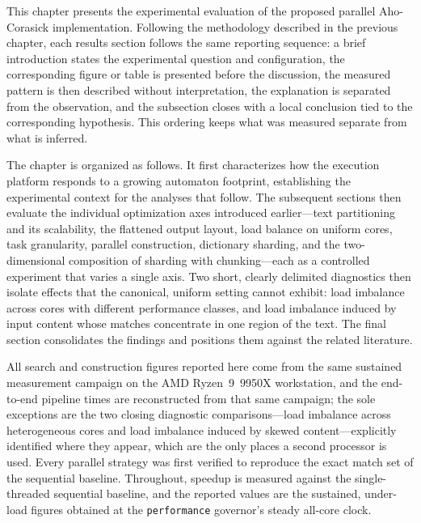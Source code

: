 This chapter presents the experimental evaluation of the proposed parallel
Aho-Corasick implementation. Following the methodology described in the previous
chapter, each results section follows the same reporting sequence: a brief
introduction states the experimental question and configuration, the corresponding
figure or table is presented before the discussion, the measured pattern is then
described without interpretation, the explanation is separated from the observation,
and the subsection closes with a local conclusion tied to the corresponding
hypothesis. This ordering keeps what was measured separate from what is inferred.

The chapter is organized as follows. It first characterizes how the execution
platform responds to a growing automaton footprint, establishing the experimental
context for the analyses that follow. The subsequent sections then evaluate the
individual optimization axes introduced earlier---text partitioning and its
scalability, the flattened output layout, load balance on uniform cores, task
granularity, parallel construction, dictionary sharding, and the two-dimensional
composition of sharding with chunking---each as a controlled experiment that
varies a single axis. Two short, clearly delimited diagnostics then isolate
effects that the canonical, uniform setting cannot exhibit: load imbalance across
cores with different performance classes, and load imbalance induced by input
content whose matches concentrate in one region of the text. The final section
consolidates the findings and positions them against the related literature.

All search and construction figures reported here come from the same sustained
measurement campaign on the AMD Ryzen~9~9950X workstation, and the end-to-end
pipeline times are reconstructed from that same campaign; the sole exceptions are
the two closing diagnostic comparisons---load imbalance across heterogeneous cores
and load imbalance induced by skewed content---explicitly identified where they
appear, which are the only places a second processor is used.
Every parallel strategy was first
verified to reproduce the exact match set of the sequential baseline. Throughout,
speedup is measured against the single-threaded sequential baseline, and the
reported values are the sustained, under-load figures obtained at the
\texttt{performance} governor's steady all-core clock.


\newpage
{}
\label{subsec:footprint}

